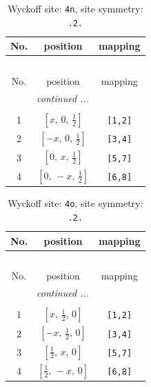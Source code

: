 \documentclass[fleqn,8pt]{jsarticle}
\begin{document}
\renewcommand{\arraystretch}{1.2}
\begin{longtable}{ccc}
\caption{Wyckoff site: {\tt 4n}, site symmetry: {\tt .2.}}
 \\
 \hline \hline
No. & position & mapping \\ \hline \endfirsthead

\multicolumn{2}{l}{\tablename\ \thetable{}} \\
 \hline \hline
No. & position & mapping \\ \hline \endhead

 \hline \hline
\multicolumn{2}{r}{\footnotesize\it continued ...} \\ \endfoot

 \hline \hline
\multicolumn{2}{r}{} \\ \endlastfoot

1 & $\left[ x,\, 0,\, \frac{1}{2} \right]$ & {\tt [1,2]} \\ \hline
2 & $\left[ - x,\, 0,\, \frac{1}{2} \right]$ & {\tt [3,4]} \\ \hline
3 & $\left[ 0,\, x,\, \frac{1}{2} \right]$ & {\tt [5,7]} \\ \hline
4 & $\left[ 0,\, - x,\, \frac{1}{2} \right]$ & {\tt [6,8]} \\
\end{longtable}
\renewcommand{\arraystretch}{1.2}
\begin{longtable}{ccc}
\caption{Wyckoff site: {\tt 4o}, site symmetry: {\tt .2.}}
 \\
 \hline \hline
No. & position & mapping \\ \hline \endfirsthead

\multicolumn{2}{l}{\tablename\ \thetable{}} \\
 \hline \hline
No. & position & mapping \\ \hline \endhead

 \hline \hline
\multicolumn{2}{r}{\footnotesize\it continued ...} \\ \endfoot

 \hline \hline
\multicolumn{2}{r}{} \\ \endlastfoot

1 & $\left[ x,\, \frac{1}{2},\, 0 \right]$ & {\tt [1,2]} \\ \hline
2 & $\left[ - x,\, \frac{1}{2},\, 0 \right]$ & {\tt [3,4]} \\ \hline
3 & $\left[ \frac{1}{2},\, x,\, 0 \right]$ & {\tt [5,7]} \\ \hline
4 & $\left[ \frac{1}{2},\, - x,\, 0 \right]$ & {\tt [6,8]} \\
\end{longtable}
\end{document}
